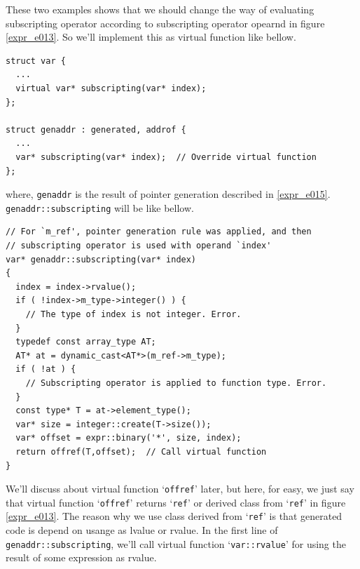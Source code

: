 These two examples shows that we should change the way of evaluating
subscripting operator according to subscripting operator opearnd
in figure \ref{expr_e013}. So we'll implement this as virtual function
like bellow.
\begin{verbatim}
struct var {
  ...
  virtual var* subscripting(var* index);
};

struct genaddr : generated, addrof {
  ...
  var* subscripting(var* index);  // Override virtual function
};
\end{verbatim}
where, {\tt{genaddr}} is the result of pointer generation described in
\ref{expr_e015}. {\tt{genaddr::subscripting}} will be like bellow.
\begin{verbatim}
// For `m_ref', pointer generation rule was applied, and then
// subscripting operator is used with operand `index'
var* genaddr::subscripting(var* index)
{
  index = index->rvalue();
  if ( !index->m_type->integer() ) {
    // The type of index is not integer. Error. 
  }
  typedef const array_type AT;
  AT* at = dynamic_cast<AT*>(m_ref->m_type);
  if ( !at ) {
    // Subscripting operator is applied to function type. Error.
  }
  const type* T = at->element_type();
  var* size = integer::create(T->size());
  var* offset = expr::binary('*', size, index);
  return offref(T,offset);  // Call virtual function
}
\end{verbatim}
We'll discuss about virtual function `{\tt{offref}}' later,
but here, for easy, we just say that virtual function `{\tt{offref}}'
returns `{\tt{ref}}' or derived class from `{\tt{ref}}' in
figure \ref{expr_e013}.
The reason why we use class derived from `{\tt{ref}}' is
that generated code is depend on usange as lvalue or rvalue.
In the first line of {\tt{genaddr::subscripting}}, we'll call virtual function
`{\tt{var::rvalue}}' for using the result of some expression as rvalue.


